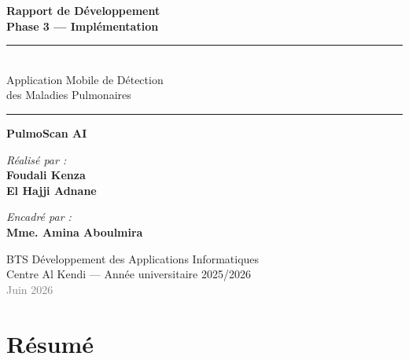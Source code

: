 \documentclass[12pt, a4paper]{report}
\begin{document}
\begin{titlepage}
  \centering
  \vspace*{1.5cm}


  \vspace{1cm}
  {\LARGE\bfseries Rapport de Développement\\[0.4em]
   \textcolor{psTeal}{Phase 3 — Implémentation}}\\[0.3em]
  \rule{\linewidth}{1.5pt}\\[0.3em]
  {\large Application Mobile de Détection\\des Maladies Pulmonaires}\\[0.2em]
  \rule{\linewidth}{0.6pt}

  \vspace{1.2cm}
  {\huge\bfseries\textcolor{psTeal}{PulmoScan AI}}

  \vspace{1.5cm}
  \begin{minipage}{0.48\textwidth}
    \centering
    {\small\textit{Réalisé par :}}\\[0.4em]
    {\bfseries Foudali Kenza}\\
    {\bfseries El Hajji Adnane}
  \end{minipage}
  \hfill
  \begin{minipage}{0.48\textwidth}
    \centering
    {\small\textit{Encadré par :}}\\[0.4em]
    {\bfseries Mme. Amina Aboulmira}
  \end{minipage}

  \vfill
  {\small BTS Développement des Applications Informatiques\\
   Centre Al Kendi — Année universitaire 2025/2026}\\[0.5em]
  {\small\textcolor{gray}{Juin 2026}}
\end{titlepage}

\chapter*{Résumé}
\end{document}
